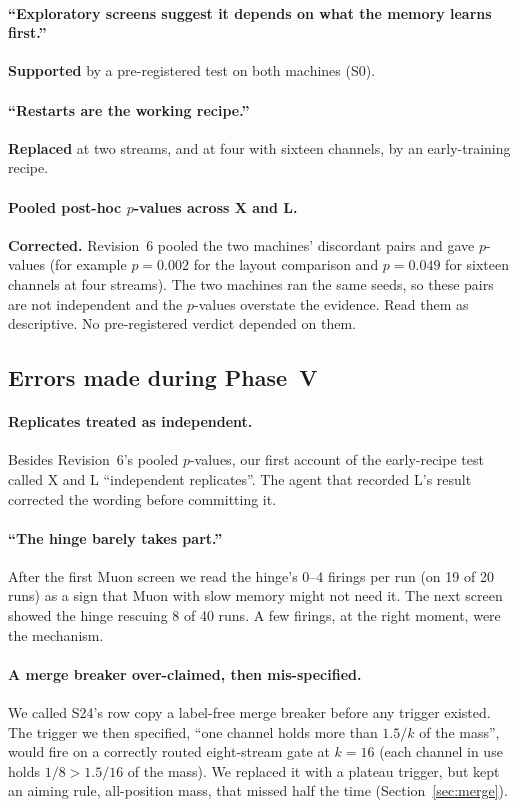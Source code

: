 \documentclass[11pt]{article}
\begin{document}
\paragraph{``Exploratory screens suggest it depends on what the memory learns first.''} \textbf{Supported} by a pre-registered test on both machines (S0).

\paragraph{``Restarts are the working recipe.''} \textbf{Replaced} at two streams, and at four with sixteen channels, by an early-training recipe.

\paragraph{Pooled post-hoc $p$-values across X and L.} \textbf{Corrected.} Revision~6 pooled the two machines' discordant pairs and gave $p$-values (for example $p = 0.002$ for the layout comparison and $p = 0.049$ for sixteen channels at four streams). The two machines ran the same seeds, so these pairs are not independent and the $p$-values overstate the evidence. Read them as descriptive. No pre-registered verdict depended on them.

\subsection{Errors made during Phase~V}
\label{sec:errors}

\paragraph{Replicates treated as independent.} Besides Revision~6's pooled $p$-values, our first account of the early-recipe test called X and L ``independent replicates''. The agent that recorded L's result corrected the wording before committing it.

\paragraph{``The hinge barely takes part.''} After the first Muon screen we read the hinge's 0--4 firings per run (on 19 of 20 runs) as a sign that Muon with slow memory might not need it. The next screen showed the hinge rescuing 8 of 40 runs. A few firings, at the right moment, were the mechanism.

\paragraph{A merge breaker over-claimed, then mis-specified.} We called S24's row copy a label-free merge breaker before any trigger existed. The trigger we then specified, ``one channel holds more than $1.5/k$ of the mass'', would fire on a correctly routed eight-stream gate at $k = 16$ (each channel in use holds $1/8 > 1.5/16$ of the mass). We replaced it with a plateau trigger, but kept an aiming rule, all-position mass, that missed half the time (Section~\ref{sec:merge}).
\end{document}
